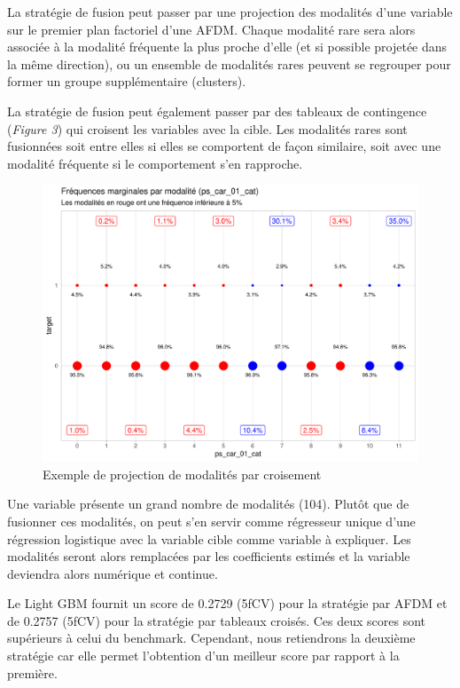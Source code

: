 \documentclass[french]{article}
\begin{document}
\begin{multicols}{2}
La stratégie de fusion peut passer par une projection des modalités d'une variable sur le premier plan factoriel d'une AFDM. Chaque modalité rare sera alors associée à la modalité fréquente la plus proche d'elle (et si possible projetée dans la même direction), ou un ensemble de modalités rares peuvent se regrouper pour former un groupe supplémentaire (clusters).

La stratégie de fusion peut également passer par des tableaux de contingence (\emph{Figure 3}) qui croisent les variables avec la cible. Les modalités rares sont fusionnées soit entre elles si elles se comportent de façon similaire, soit avec une modalité fréquente si le comportement s'en rapproche.

\begin{figure}[H] \centering
  \includegraphics[width = \columnwidth]{img/ex_tabc}
  \caption{Exemple de projection de modalités par croisement}
\end{figure}

Une variable présente un grand nombre de modalités (104). Plutôt que de fusionner ces modalités, on peut s'en servir comme régresseur unique d'une régression logistique avec la variable cible comme variable à expliquer. Les modalités seront alors remplacées par les coefficients estimés et la variable deviendra alors numérique et continue.

Le Light GBM fournit un score de 0.2729 (5fCV) pour la stratégie par AFDM et de 0.2757 (5fCV) pour la stratégie par tableaux croisés. Ces deux scores sont supérieurs à celui du benchmark. Cependant, nous retiendrons la deuxième stratégie car elle permet l'obtention d'un meilleur score par rapport à la première.


\end{multicols}
\end{document}
